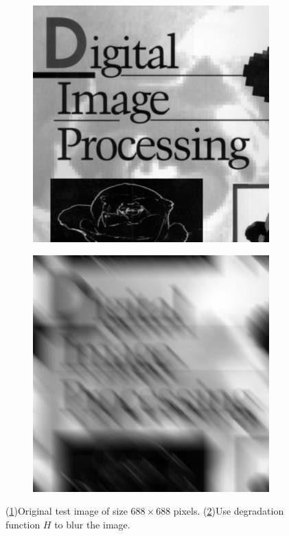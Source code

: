 \begin{figure}[h]
	\centering
	\begin{subfigure}[b]{0.45\linewidth}
		\includegraphics[width=\linewidth]{myfigure/p5/book_cover.png}
		\caption{}
		\label{fig:5_orig}
	\end{subfigure}
  	\begin{subfigure}[b]{0.45\linewidth}
		\includegraphics[width=\linewidth]{myfigure/p5/5_blur.png}
		\caption{}
		\label{fig:5_blur}
	\end{subfigure}
  	\caption{(\ref{fig:5_orig})Original test image of size $688\times 688$ pixels. (\ref{fig:5_blur})Use degradation function $H$ to blur the image.}
  	\label{fig:orig_blur}
\end{figure}

